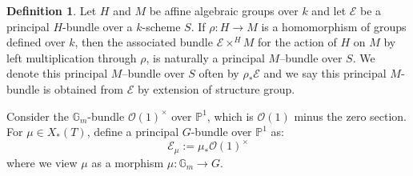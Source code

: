 \documentclass{amsart}
\newcommand{\cE}{\mathcal{E}}
\newcommand{\gm}{\mathbb{G}_{m}}
\theoremstyle{plain}
\theoremstyle{definition}
\newtheorem{definition}{Definition}
\theoremstyle{remark}
\begin{document}
\begin{definition}
Let $H$ and $M$ be affine
algebraic groups over $k$ and let $\cE$ be a principal $H$-bundle over a $k$-scheme $S$. If $\rho:H\rightarrow M$ is a homomorphism of groups defined over $k$, then the associated bundle $\cE\times^{H}M$ for the action of $H$ on $M$ by left multiplication through $\rho$, is naturally a principal $M$–bundle over $S$. We denote this principal $M$–bundle over $S$ often by $\rho_{*}\cE$ and we say this principal $M$-bundle is obtained from $\cE$ by extension of structure group.
\end{definition}
Consider the $\gm$-bundle $\mathcal{O}(1)^\times$ over $\mathbb{P}^{1}$, which is $\mathcal{O}(1)$ minus the zero section. For $\mu\in X_{*}(T)$, define a principal $G$-bundle over $\mathbb P^1$ as:
\[
\cE_{\mu}:=\mu_{*}\mathcal{O}(1)^{\times}
\]
where we view $\mu$ as a morphism $\mu:\mathbb{G}_{m}\rightarrow G$.
\end{document}
